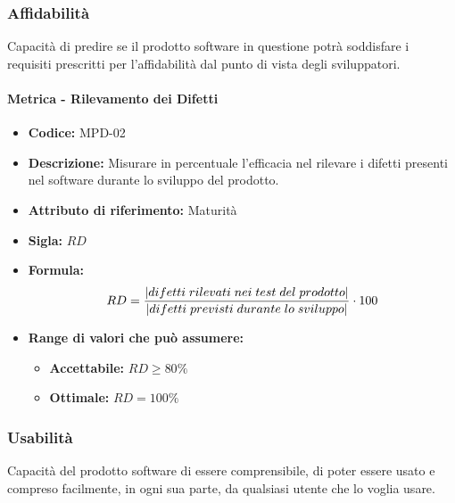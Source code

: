 \subsubsection{Affidabilità} 
Capacità di predire se il prodotto software in questione potrà soddisfare i requisiti prescritti per l'affidabilità dal punto di vista degli sviluppatori.

\paragraph{Metrica - Rilevamento dei Difetti} 
\begin{itemize}
    \item \textbf{Codice:} MPD-02
    \item \textbf{Descrizione:} Misurare in percentuale l'efficacia nel rilevare i difetti presenti nel software durante lo sviluppo del prodotto.
    \item \textbf{Attributo di riferimento:} Maturità
    \item \textbf{Sigla:} $RD$
    \item \textbf{Formula:} $$RD = {|difetti \; rilevati \; nei \; test \; del \; prodotto| \over |difetti \; previsti \; durante \; lo \; sviluppo|} \cdot 100 $$
    \item \textbf{Range di valori che può assumere:}
    \begin{itemize}
        \item \textbf{Accettabile:} $RD \geq 80\% $
        \item \textbf{Ottimale:} $RD = 100\%$
    \end{itemize}
\end{itemize}

\subsubsection{Usabilità} 
Capacità del prodotto software di essere comprensibile, di poter essere usato e compreso facilmente, in ogni sua parte, da qualsiasi utente che lo voglia usare.\\
